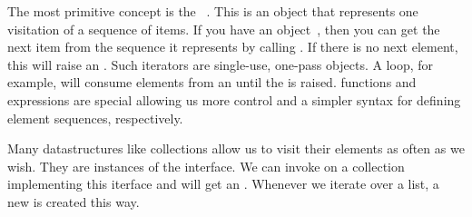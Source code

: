 The most primitive concept is the ~\cite{PEP234}.
This is an object that represents one visitation of a sequence of items.
If you have an  object~, then you can get the next item from the sequence it represents by calling .
If there is no next element, this will raise an .
Such iterators are single-use, one-pass objects.
A  loop, for example, will consume elements from an  until the  is raised.
 functions and expressions are special  allowing us more control and a simpler syntax for defining element sequences, respectively.

Many datastructures like collections allow us to visit their elements as often as we wish.
They are instances of the  interface.
We can invoke  on a collection  implementing this  iterface and will get an .
Whenever we iterate over a list, a new  is created this way.

